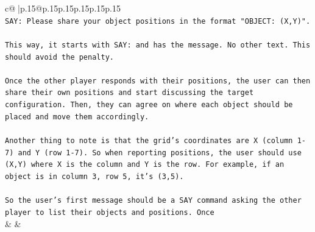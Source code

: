 \documentclass{article}
\begin{document}
{\begin{supertabular}{c@{$\;$}|p{.15\linewidth}@{}p{.15\linewidth}p{.15\linewidth}p{.15\linewidth}p{.15\linewidth}p{.15\linewidth}}
{{{\\ 
\texttt{SAY: Please share your object positions in the format "OBJECT: (X,Y)".} \\
\\ 
\texttt{This way, it starts with SAY: and has the message. No other text. This should avoid the penalty.} \\
\\ 
\texttt{Once the other player responds with their positions, the user can then share their own positions and start discussing the target configuration. Then, they can agree on where each object should be placed and move them accordingly.} \\
\\ 
\texttt{Another thing to note is that the grid's coordinates are X (column 1{-}7) and Y (row 1{-}7). So when reporting positions, the user should use (X,Y) where X is the column and Y is the row. For example, if an object is in column 3, row 5, it's (3,5).} \\
\\ 
\texttt{So the user's first message should be a SAY command asking the other player to list their objects and positions. Once} \\
            }
        }
    }
    & & \\ \\


\end{supertabular}}
\end{document}
